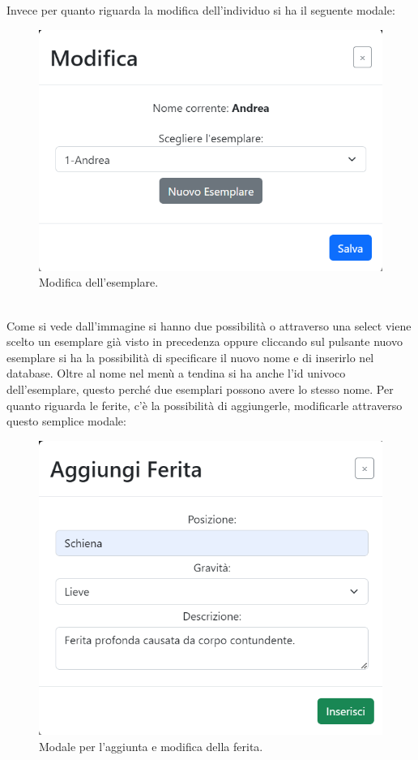 \documentclass[a4paper,final,12pt]{report}
\begin{document}
\newpage
Invece per quanto riguarda la modifica dell'individuo si ha il seguente modale:
\begin{figure}[hbtp]
\centering
\includegraphics[scale=0.90]{img_concettuale/modificaNome.png}
\caption{Modifica dell'esemplare.}
\end{figure}
\\Come si vede dall'immagine si hanno due possibilità o attraverso una select viene scelto un esemplare già visto in precedenza oppure cliccando sul pulsante nuovo esemplare si ha la possibilità di specificare il nuovo nome e di inserirlo nel database. Oltre al nome nel menù a tendina si ha anche l'id univoco dell'esemplare, questo perché due esemplari possono avere lo stesso nome. 
\newpage
Per quanto riguarda le ferite, c'è la possibilità di aggiungerle, modificarle attraverso questo semplice modale:
\begin{figure}[hbtp]
\centering
\includegraphics[scale=0.90]{img_concettuale/ferita.png}
\caption{Modale per l'aggiunta e modifica della ferita.}
\end{figure}
\end{document}
